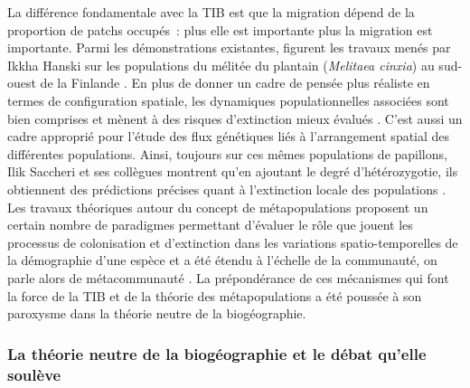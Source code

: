 La différence fondamentale avec la TIB est que la migration dépend de la
proportion de patchs occupés~: plus elle est importante plus la
migration est importante. Parmi les démonstrations existantes, figurent
les travaux menés par Ikkha Hanski sur les populations du mélitée du
plantain (\emph{Melitaea cinxia}) au sud-ouest de la Finlande
\citep{Hanski1998}. En plus de donner un cadre de pensée plus réaliste
en termes de configuration spatiale, les dynamiques populationnelles
associées sont bien comprises et mènent à des risques d'extinction mieux
évalués \citep{Hanski1998}. C'est aussi un cadre approprié pour l'étude
des flux génétiques liés à l'arrangement spatial des différentes
populations. Ainsi, toujours sur ces mêmes populations de papillons,
Ilik Saccheri et ses collègues montrent qu'en ajoutant le degré
d'hétérozygotie, ils obtiennent des prédictions précises quant à
l'extinction locale des populations \citep{Saccheri1998}. Les travaux
théoriques autour du concept de métapopulations proposent un certain
nombre de paradigmes permettant d'évaluer le rôle que jouent les
processus de colonisation et d'extinction dans les variations
spatio-temporelles de la démographie d'une espèce et a été étendu à
l'échelle de la communauté, on parle alors de métacommunauté
\citep{Leibold2004, Holyoak2005}. La prépondérance de ces mécanismes qui
font la force de la TIB et de la théorie des métapopulations a été
poussée à son paroxysme dans la théorie neutre de la biogéographie.

\subsubsection*{La théorie neutre de la biogéographie et le débat
qu'elle
soulève}\label{la-thuxe9orie-neutre-de-la-bioguxe9ographie-et-le-duxe9bat-quelle-souluxe8ve}

